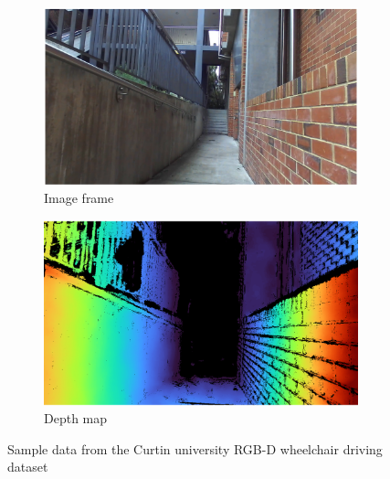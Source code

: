 \begin{figure}[b]
    \centering
    \begin{subfigure}{.48\textwidth}
        \centering
        \includegraphics[width=\linewidth]{images/zed_sample_image.png}
        \caption{Image frame}
    \end{subfigure}
    \quad
    \begin{subfigure}{.47\textwidth}
        \centering
        \includegraphics[width=\linewidth]{images/zed_sample_depth.png}
        \caption{Depth map}
    \end{subfigure}
    \caption{Sample data from the Curtin university RGB-D wheelchair driving dataset}
    \label{fig:zed_sample_dataset}
\end{figure}
